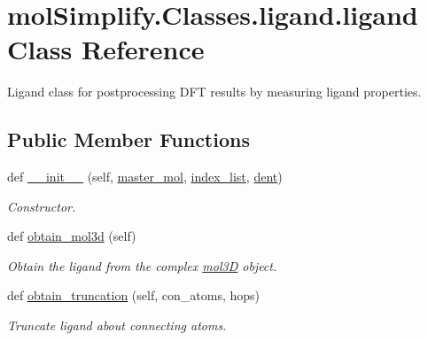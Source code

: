 \hypertarget{classmolSimplify_1_1Classes_1_1ligand_1_1ligand}{}\section{mol\+Simplify.\+Classes.\+ligand.\+ligand Class Reference}
\label{classmolSimplify_1_1Classes_1_1ligand_1_1ligand}


Ligand class for postprocessing D\+FT results by measuring ligand properties.  


\subsection*{Public Member Functions}
\begin{DoxyCompactItemize}
\item 
def \hyperlink{classmolSimplify_1_1Classes_1_1ligand_1_1ligand_ab9c068d82f0bb9b6494a734558930984}{\+\_\+\+\_\+init\+\_\+\+\_\+} (self, \hyperlink{classmolSimplify_1_1Classes_1_1ligand_1_1ligand_a4789951476ce69aa2b606b97ac535f41}{master\+\_\+mol}, \hyperlink{classmolSimplify_1_1Classes_1_1ligand_1_1ligand_ab9dfcb555aa0d747bf5e824c70149684}{index\+\_\+list}, \hyperlink{classmolSimplify_1_1Classes_1_1ligand_1_1ligand_aba886d417452a3657a9c6d5e091af3d1}{dent})
\begin{DoxyCompactList}\small\item\em Constructor. \end{DoxyCompactList}\item 
def \hyperlink{classmolSimplify_1_1Classes_1_1ligand_1_1ligand_a17875db54ebc0308065d8efdcdd736c4}{obtain\+\_\+mol3d} (self)
\begin{DoxyCompactList}\small\item\em Obtain the ligand from the complex \hyperlink{namespacemolSimplify_1_1Classes_1_1mol3D}{mol3D} object. \end{DoxyCompactList}\item 
def \hyperlink{classmolSimplify_1_1Classes_1_1ligand_1_1ligand_a26d131235b504f894e47e483f105fbfd}{obtain\+\_\+truncation} (self, con\+\_\+atoms, hops)
\begin{DoxyCompactList}\small\item\em Truncate ligand about connecting atoms. \end{DoxyCompactList}\end{DoxyCompactItemize}
